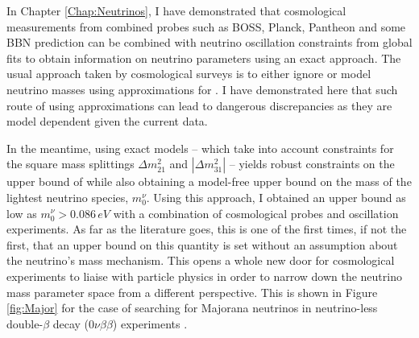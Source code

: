 \qquad In Chapter \ref{Chap:Neutrinos}, I have demonstrated that cosmological measurements from combined probes such as BOSS, Planck, Pantheon and some BBN prediction can be combined with neutrino oscillation constraints from global fits to obtain information on neutrino parameters using an exact approach. The usual approach taken by cosmological surveys is to either ignore or model neutrino masses using approximations for \NM. I have demonstrated here that such route of using approximations can lead to dangerous discrepancies as they are model dependent given the current data. 

\qquad In the meantime, using exact models -- which take into account constraints for the square mass splittings $\Delta m_{21}^2$ and $|\Delta m_{31}^2|$ -- yields robust constraints on the upper bound of \NM{} while also obtaining a model-free upper bound on the mass of the lightest neutrino species, $m_0^{\nu}$. Using this approach, I obtained an upper bound as low as $m_0^{\nu} > 0.086\, eV$ with a combination of cosmological probes and oscillation experiments. As far as the literature goes, this is one of the first times, if not the first, that an upper bound on this quantity is set without an assumption about the neutrino's mass mechanism. This opens a whole new door for cosmological experiments to liaise with particle physics in order to narrow down the neutrino mass parameter space from a different perspective. This is shown in Figure \ref{fig:Major} for the case of searching for Majorana neutrinos in neutrino-less double-$\beta$ decay ($0\nu\beta\beta$) experiments \citep{2016DoubleBetaReview}. 

